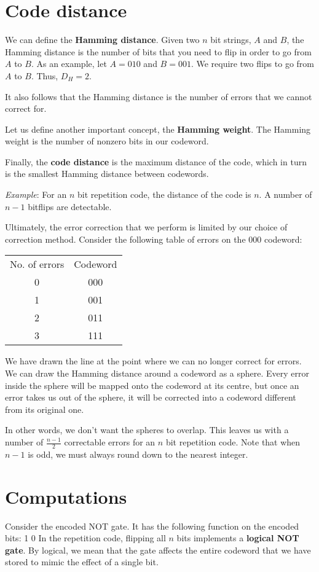 \section{Code distance}
We can define the \textbf{Hamming distance}. Given two $n$ bit strings, $A$ and $B$, the Hamming distance is the number of bits that you need to flip in order to go from $A$ to $B$. As an example, let $A = 010$ and $B = 001$. We require two flips to go from $A$ to $B$. Thus, $D_H = 2$. 

It also follows that the Hamming distance is the number of errors that we cannot correct for. 

Let us define another important concept, the \textbf{Hamming weight}. The Hamming weight is the number of nonzero bits in our codeword. 

Finally, the \textbf{code distance} is the maximum distance of the code, which in turn is the smallest Hamming distance between codewords. 

\emph{Example}: For an $n$ bit repetition code, the distance of the code is $n$. A number of $n-1$ bitflips are detectable. 

Ultimately, the error correction that we perform is limited by our choice of correction method. Consider the following table of errors on the $000$ codeword:

\begin{tabular}{c| c}
\hline
No. of errors &Codeword\\ 
0 & 000 \\ 
1 & 001 \\ \hline
2 & 011 \\
3 &111
\end{tabular}
We have drawn the line at the point where we can no longer correct for errors. We can draw the Hamming distance around a codeword as a sphere. Every error inside the sphere will be mapped onto the codeword at its centre, but once an error takes us out of the sphere, it will be corrected into a codeword different from its original one. 

In other words, we don't want the spheres to overlap. This leaves us with a number of $\frac{n-1}{2}$ correctable errors for an $n$ bit repetition code. Note that when $n-1$ is odd, we must always round down to the nearest integer. 


\section{Computations}
Consider the encoded NOT gate. It has the following function on the encoded bits:
  1
\eeq
{}  0 
\eeq
In the repetition code, flipping all $n$ bits implements a \textbf{logical NOT gate}. By logical, we mean that the gate affects the entire codeword that we have stored to mimic the effect of a single bit. 

